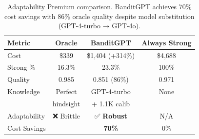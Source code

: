 \begin{table}[h]
\centering
\small
\begin{tabular}{@{}lccc@{}}
\toprule
\textbf{Metric} & \textbf{Oracle} & \textbf{BanditGPT} & \textbf{Always Strong} \\ \midrule
Cost & \$339 & \$1,404 (+314\%) & \$4,688 \\
Strong \% & 16.3\% & 23.3\% & 100\% \\
Quality & 0.985 & 0.851 (86\%) & 0.971 \\
Knowledge & Perfect & GPT-4-turbo & None \\
 & hindsight & + 1.1K calib & \\
Adaptability & ❌ Brittle & ✅ \textbf{Robust} & N/A \\
Cost Savings & — & \textbf{70\%} & 0\% \\
\bottomrule
\end{tabular}
\caption{Adaptability Premium comparison. BanditGPT achieves 70\% cost savings with 86\% oracle quality despite model substitution (GPT-4-turbo → GPT-4o).}
\label{tab:adaptability_compact}
\end{table}

